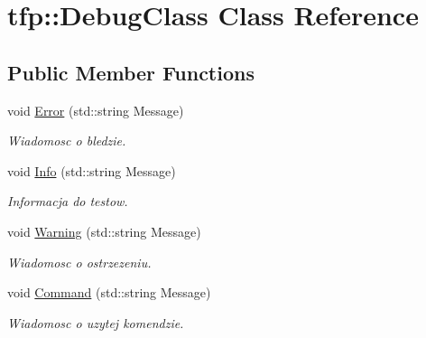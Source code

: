 \hypertarget{classtfp_1_1_debug_class}{}\section{tfp\+:\+:Debug\+Class Class Reference}
\label{classtfp_1_1_debug_class}
\subsection*{Public Member Functions}
\begin{DoxyCompactItemize}
\item 
\mbox{\label{classtfp_1_1_debug_class_a504eef6b38440a5ab98d1b44a22c5b7d}} 
void \mbox{\hyperlink{classtfp_1_1_debug_class_a504eef6b38440a5ab98d1b44a22c5b7d}{Error}} (std\+::string Message)
\begin{DoxyCompactList}\small\item\em Wiadomosc o bledzie. \end{DoxyCompactList}\item 
\mbox{\label{classtfp_1_1_debug_class_ae0a7705a4594cec104ebea2300881551}} 
void \mbox{\hyperlink{classtfp_1_1_debug_class_ae0a7705a4594cec104ebea2300881551}{Info}} (std\+::string Message)
\begin{DoxyCompactList}\small\item\em Informacja do testow. \end{DoxyCompactList}\item 
\mbox{\label{classtfp_1_1_debug_class_a44446f2e6062113d16ee1c9c8bb4e812}} 
void \mbox{\hyperlink{classtfp_1_1_debug_class_a44446f2e6062113d16ee1c9c8bb4e812}{Warning}} (std\+::string Message)
\begin{DoxyCompactList}\small\item\em Wiadomosc o ostrzezeniu. \end{DoxyCompactList}\item 
\mbox{\label{classtfp_1_1_debug_class_abfe06ba8dd78d2e8430325c70c1fa32e}} 
void \mbox{\hyperlink{classtfp_1_1_debug_class_abfe06ba8dd78d2e8430325c70c1fa32e}{Command}} (std\+::string Message)
\begin{DoxyCompactList}\small\item\em Wiadomosc o uzytej komendzie. \end{DoxyCompactList}\item 

\end{DoxyCompactItemize}
